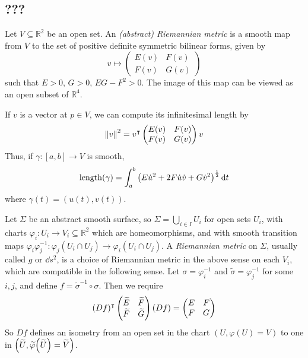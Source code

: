 \subsection{???}
\begin{definition}
	Let \( V \subseteq \mathbb R^2 \) be an open set.
	An \textit{(abstract) Riemannian metric} is a smooth map from \( V \) to the set of positive definite symmetric bilinear forms, given by
	\[ v \mapsto \begin{pmatrix}
		E(v) & F(v) \\
		F(v) & G(v)
	\end{pmatrix} \]
	such that \( E > 0 \), \( G > 0 \), \( EG - F^2 > 0 \).
	The image of this map can be viewed as an open subset of \( \mathbb R^4 \).
\end{definition}
If \( v \) is a vector at \( p \in V \), we can compute its infinitesimal length by
\[ \norm{v}^2 = v^\intercal \begin{pmatrix}
	E(v) & F(v) \\
	F(v) & G(v)
\end{pmatrix} v \]
Thus, if \( \gamma \colon [a,b] \to V \) is smooth,
\[ \mathrm{length}(\gamma) = \int_a^b \qty( E \dot u^2 + 2F \dot u \dot v + G \dot v^2 )^{\frac{1}{2}} \dd{t} \]
where \( \gamma(t) = (u(t),v(t)) \).
\begin{definition}
	Let \( \Sigma \) be an abstract smooth surface, so \( \Sigma = \bigcup_{i \in I} U_i \) for open sets \( U_i \), with charts \( \varphi_i \colon U_i \to V_i \subseteq \mathbb R^2 \) which are homeomorphisms, and with smooth transition maps \( \varphi_i \varphi_j^{-1} \colon \varphi_j(U_i \cap U_j) \to \varphi_i(U_i \cap U_j) \).
	A \textit{Riemannian metric} on \( \Sigma \), usually called \( g \) or \( \dd{s}^2 \), is a choice of Riemannian metric in the above sense on each \( V_i \), which are compatible in the following sense.
	Let \( \sigma = \varphi_i^{-1} \) and \( \widetilde \sigma = \varphi_j^{-1} \) for some \( i,j \), and define \( f = \widetilde \sigma^{-1} \circ \sigma \).
	Then we require
	\[ (Df)^\intercal \begin{pmatrix}
		\widetilde E & \widetilde F \\
		\widetilde F & \widetilde G
	\end{pmatrix} (Df) = \begin{pmatrix}
		E & F \\
		F & G
	\end{pmatrix} \]
	So \( Df \) defines an isometry from an open set in the chart \( (U, \varphi(U) = V) \) to one in \( \qty(\widetilde U, \widetilde \varphi\qty(\widetilde U) = \widetilde V) \).
\end{definition}
